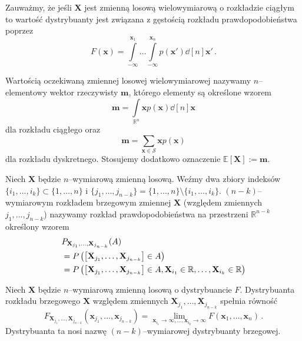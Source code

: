 \documentclass{myclass}
\numberwithin{equation}{subsection}
\begin{document}
Zauważmy, że jeśli \(\mathbf{X}\) jest zmienną losową wielowymiarową o rozkładzie ciągłym to wartość
dystrybuanty jest związana z gęstością rozkładu prawdopodobieństwa poprzez
\begin{equation}
    F(\mathbf{x}) = \int\limits_{-\infty}^{\mathbf{x}_1}\ldots\int\limits_{-\infty}^{\mathbf{x}_n} p(\mathbf{x}') \dd[n]{\mathbf{x}'}\,.
\end{equation}

\begin{definition}
Wartością oczekiwaną zmiennej losowej wielowymiarowej nazywamy \(n\)--elementowy wektor rzeczywisty
\(\mathbf{m}\), którego elementy są określone wzorem
\begin{equation*}
    \mathbf{m} = \int\limits_{\mathbb{R}^n} \mathbf{x} p(\mathbf{x}) \dd[n]{\mathbf{x}}
\end{equation*}
dla rozkładu ciągłego oraz
\begin{equation*}
    \mathbf{m} = \sum_{\mathbf{x} \in \mathcal{S}} \mathbf{x} p(\mathbf{x})
\end{equation*}
dla rozkładu dyskretnego. Stosujemy dodatkowo oznaczenie \(\mathbb{E}[\mathbf{X}] := \mathbf{m}\).
\end{definition}

\begin{definition}
Niech \(\mathbf{X}\) będzie \(n\)--wymiarową zmienną losową. Weźmy dwa zbiory indeksów
\(\{i_1,\ldots,i_k\} \subset \{1,\ldots,n\}\) i \(\{j_1,\ldots,j_{n-k}\} = \{1,\ldots,n\} \setminus
\{i_1,\ldots,i_k\}\). \((n-k)\)--wymiarowym rozkładem brzegowym zmiennej \(\mathbf{X}\) (względem
zmiennych \(j_1,\ldots,j_{n-k}\)) nazywamy rozkład prawdopodobieństwa na przestrzeni
\(\mathbb{R}^{n-k}\) określony wzorem
\begin{equation*}
    \begin{split}
        &P_{\mathbf{X}_{j_1},\ldots,\mathbf{X}_{j_{n-k}}}(A) \\
        &= P\left(\mqty[\mathbf{X}_{j_1},\ldots,\mathbf{X}_{j_{n-k}}] \in A\right)\\
        &= P\left(\mqty[\mathbf{X}_{j_1},\ldots,\mathbf{X}_{j_{n-k}}] \in A, \mathbf{X}_{i_1} \in \mathbb{R}, \ldots, \mathbf{X}_{i_k} \in \mathbb{R}\right)
    \end{split}
\end{equation*}    
\end{definition}

Niech \(\mathbf{X}\) będzie \(n\)--wymiarową zmienną losową o dystrybuancie \(F\). Dystrybuanta
rozkładu brzegowego \(\mathbf{X}\) względem zmiennych
\(\mathbf{X}_{j_1},\ldots,\mathbf{X}_{j_{n-k}}\) spełnia równość
\begin{equation}
    F_{\mathbf{X}_{j_1},\ldots,\mathbf{X}_{j_{n-k}}}(\mathbf{x}_{j_1},\ldots,\mathbf{x}_{j_{n-k}}) = \lim_{\mathbf{x}_{i_1} \to \infty,\ldots,\mathbf{x}_{i_k} \to \infty} F(\mathbf{x}_1,\ldots,\mathbf{x}_n)\,.
\end{equation}
Dystrybuanta ta nosi nazwę \((n-k)\)--wymiarowej dystrybuanty brzegowej.
\end{document}
